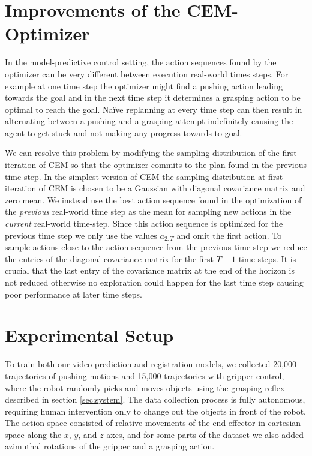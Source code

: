 \section{Improvements of the CEM-Optimizer}
\label{sec:cem_improv}
In the model-predictive control setting, the action sequences found by the optimizer can be very different between execution real-world times steps. For example at one time step the optimizer might find a pushing action leading towards the goal and in the next time step it determines a grasping action to be optimal to reach the goal. Na\"{i}ve replanning at every time step can then result in alternating between a pushing and a grasping attempt indefinitely causing the agent to get stuck and not making any progress towards to goal. 

We can resolve this problem by modifying the sampling distribution of the first iteration of CEM so that the optimizer commits to the plan found in the previous time step. In the simplest version of CEM the sampling distribution at first iteration of CEM is chosen to be a Gaussian with diagonal covariance matrix and zero mean. We instead use the best action sequence found in the optimization of the \emph{previous} real-world time step as the mean for sampling new actions in the \emph{current} real-world time-step. Since this action sequence is optimized for the previous time step we only use the values $a_{2:T}$ and omit the first action. To sample actions close to the action sequence from the previous time step we reduce the entries of the diagonal covariance matrix for the first $T-1$ time steps. It is crucial that the last entry of the covariance matrix at the end of the horizon is not reduced otherwise no exploration could happen for the last time step causing poor performance at later time steps.

\section{Experimental Setup}
\label{sec:experiment_setup}
To train both our video-prediction and registration models, we collected 20,000 trajectories of pushing motions and 15,000 trajectories with gripper control, where the robot randomly picks and moves objects using the grasping reflex described in section \ref{sec:system}. The data collection process is fully autonomous, requiring human intervention only to change out the objects in front of the robot. The action space consisted of relative movements of the end-effector in cartesian space along the $x$, $y$, and $z$ axes, and for some parts of the dataset we also added azimuthal rotations of the gripper and a grasping action.

